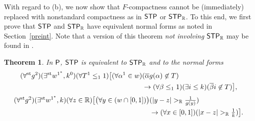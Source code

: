 \documentclass[reqno]{amsart}
\newtheorem{thm}{Theorem}
\newcommand\be{\begin{equation}}
\newcommand\ee{\end{equation}}
\def\STP{\textup{\textsf{STP}}}
\def\P{\textup{\textsf{P}}}
\def\R{{\mathbb  R}}
\def\R{{\mathbb{R}}}
\def\st{\textup{st}}
\def\di{\rightarrow}
\numberwithin{equation}{section}
\numberwithin{thm}{section}
\begin{document}
With regard to (b), we now show that $F$-compactness cannot be (immediately) replaced with nonstandard compactness as in $\STP$ or $\STP_{\R}$.  
To this end, we first prove that $\STP$ and $\STP_{\R}$ have equivalent normal forms as noted in Section~\ref{preint}.  %
Note that a version of this theorem \emph{not involving $\STP_{\R}$} may be found in \cite{dagsam}.  
\begin{thm}\label{klak}
In $\P$, $\STP$ is equivalent to $\STP_{\R}$ and to the normal forms
\begin{align}\label{frukkklk2}
(\forall^{\st}g^{2})(\exists^{\st}w^{1^{*}}, k^{0})(\forall T^{1}\leq_{1}1)\big[(\forall \alpha^{1}\in w)&(\overline{\alpha}g(\alpha)\not\in T)\\
&\di(\forall \beta\leq_{1}1)(\exists i\leq k)(\overline{\beta}i\not\in T) \big], \notag
\end{align}
\begin{align}\textstyle
(\forall^{\st} g^{2})(\exists^{\st}w^{1^{*}}, k)(\forall z\in \R)
\big[ \big(\forall y\in ( w\cap [0,1])\big)&\textstyle (|y-z|>_{\R} \frac{1}{g(y)})\label{kalkuttttt2}\\
&\textstyle\di (\forall x\in [0,1])(|x-z|>_{\R}\frac{1}{k})   \big].\notag
\end{align}
\end{thm}
\end{document}
